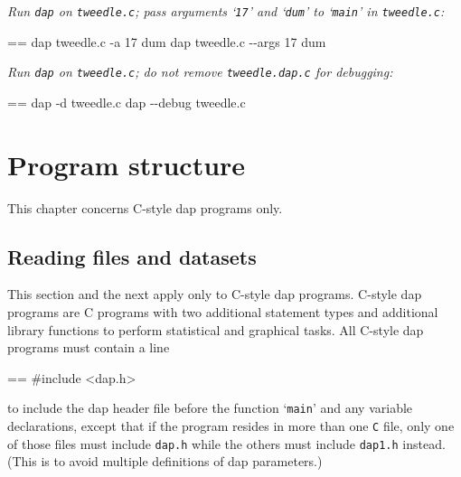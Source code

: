 \documentclass{book}
\makeatletter
\newenvironment{Texinfopreformatted}{%
  \par\GNUTobeylines\obeyspaces\frenchspacing\parskip=\z@\parindent=\z@}{}
{\catcode`\^^M=13 \gdef\GNUTobeylines{\catcode`\^^M=13 \def^^M{\null\par}}}
\newenvironment{Texinfoindented}{\begin{list}{}{}\item\relax}{\end{list}}
\renewcommand{\_}{\Texinfounderscore\discretionary{}{}{}}
\makeatother
\begin{document}
\emph{Run \texttt{dap} on \texttt{tweedle.c}; pass arguments `\texttt{17}'
and `\texttt{dum}' to `\texttt{main}' in \texttt{tweedle.c}:}
\begin{Texinfoindented}
\begin{Texinfopreformatted}%
\ttfamily dap tweedle.c -a 17 dum
dap tweedle.c {-}{-}args 17 dum
\end{Texinfopreformatted}
\end{Texinfoindented}

\emph{Run \texttt{dap} on \texttt{tweedle.c}; do not remove \texttt{tweedle.dap.c} for debugging:}
\begin{Texinfoindented}
\begin{Texinfopreformatted}%
\ttfamily dap -d tweedle.c
dap {-}{-}debug tweedle.c
\end{Texinfopreformatted}
\end{Texinfoindented}

\chapter{{Program structure}}
\label{anchor:Program-structure}%

This chapter concerns C-style dap programs only.


\section{{Reading files and datasets}}
\label{anchor:Reading-files-and-datasets}%

%
%
This section and the next apply only to C-style dap programs.
C-style dap programs are C programs with two additional statement types
and additional library functions to perform statistical and graphical tasks.
All C-style dap programs must contain a line

\begin{Texinfoindented}
\begin{Texinfopreformatted}%
\ttfamily \#include <dap.h>
\end{Texinfopreformatted}
\end{Texinfoindented}
\noindent{}to include the dap header file
%
%
before the function `\texttt{main}' and any variable declarations, except that
if the program resides in more than one \texttt{C} file, only one of those
files must include \texttt{dap.h} while the others must include \texttt{dap1.h} instead.
%
(This is to avoid multiple definitions
%
of dap parameters.)
\end{document}
